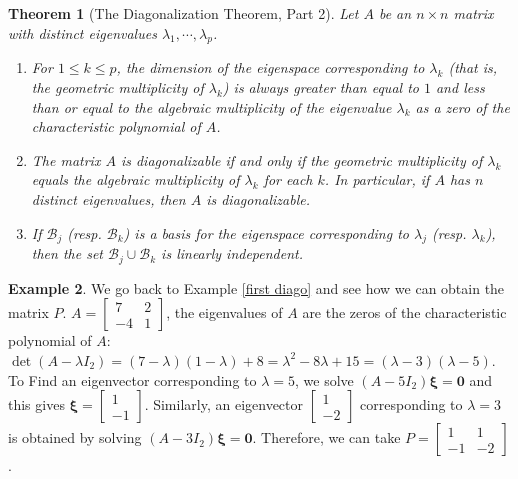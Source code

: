 \documentclass[12pt,letterpaper]{book}
\numberwithin{equation}{section}
\newtheorem{thm}{\textbf{Theorem}}[section]
\theoremstyle{definition}
\newtheorem{example}[thm]{\textbf{Example}}
\newcommand{\vxi}{\bm{\xi}}
\newcommand{\veczero}{\bm{0}}
\begin{document}
\begin{thm}[The Diagonalization Theorem, Part 2] Let $A$ be an $n\times
n$ matrix with \textit{distinct} eigenvalues $\lambda_1,\cdots, \lambda_p$.
\begin{enumerate}
\item For $1\leq k\leq p$, the dimension of the eigenspace
corresponding to $\lambda_k$ (that is, the geometric multiplicity of
$\lambda_k$) is always greater than equal to $1$ and less than or
equal to the algebraic multiplicity of the eigenvalue $\lambda_k$ as
a zero of
the characteristic polynomial of $A$.
\item The matrix $A$ is diagonalizable if and only if the
geometric multiplicity of $\lambda_k$ equals the
algebraic multiplicity of $\lambda_k$ for \textit{each} $k$. In particular, if $A$ has $n$ distinct
eigenvalues, then $A$ is diagonalizable.
\item If $\mathcal{B}_j$ (resp. $\mathcal{B}_k$) is a basis
for the eigenspace corresponding to $\lambda_j$ (resp. $\lambda_k$), then the set $\mathcal{B}_j \cup \mathcal{B}_k$ is linearly independent.
\end{enumerate}
\end{thm}

\begin{example} We go back to Example \ref{first diago} and see how
we can obtain the matrix $P$. $A=\left[\begin{array}{rr} 7 & 2 \\
-4 & 1
\end{array}\right]$, the eigenvalues of $A$ are the zeros of the
characteristic polynomial of $A$: $\det(A-\lambda
I_2)=(7-\lambda)(1-\lambda)+8=\lambda^2-8\lambda+15=(\lambda-3)(\lambda-5)$. To Find an eigenvector corresponding to $\lambda=5$, we solve $(A-5I_2)\vxi=\veczero$ and this gives $\vxi=\left[\begin{array}{r} 1 \\ -1 \end{array}\right]$. Similarly, an eigenvector $\left[\begin{array}{r} 1 \\ -2 \end{array}\right]$ corresponding to $\lambda=3$ is obtained by solving $(A-3I_2)\vxi=\veczero$. Therefore, we can take $P=\left[\begin{array}{rr} 1 &  1 \\ -1 & -2 \end{array}\right]$.
\end{example}
\end{document}

